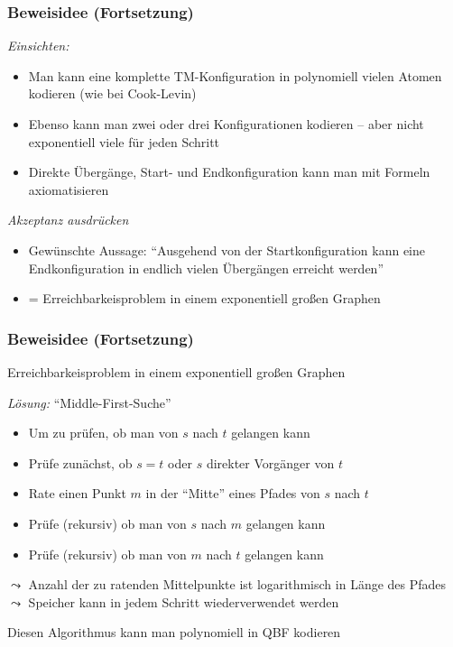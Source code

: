 \documentclass[onlymath]{beamer}
\begin{document}
\begin{frame}\frametitle{Beweisidee (Fortsetzung)}

\emph{Einsichten:}
\begin{itemize}
\item Man kann eine komplette TM-Konfiguration in polynomiell vielen Atomen
  kodieren (wie bei Cook-Levin)
\item Ebenso kann man zwei oder drei Konfigurationen kodieren -- aber nicht exponentiell viele für jeden Schritt
\item Direkte Übergänge, Start- und Endkonfiguration kann man mit Formeln axiomatisieren
\end{itemize}\bigskip\pause

\emph{Akzeptanz ausdrücken}
\begin{itemize}
\item Gewünschte Aussage: "`Ausgehend von der Startkonfiguration kann eine Endkonfiguration in endlich vielen Übergängen erreicht werden"'
\item = Erreichbarkeisproblem in einem exponentiell großen Graphen
\end{itemize}


\end{frame}

\begin{frame}\frametitle{Beweisidee (Fortsetzung)}

\alert{Erreichbarkeisproblem in einem exponentiell großen Graphen}
\bigskip\pause

\emph{Lösung:} "`Middle-First-Suche"'
\begin{itemize}
\item Um zu prüfen, ob man von $s$ nach $t$ gelangen kann
\item Prüfe zunächst, ob $s=t$ oder $s$ direkter Vorgänger von $t$
\item Rate einen Punkt $m$ in der "`Mitte"' eines Pfades von $s$ nach $t$
\item Prüfe (rekursiv) ob man von $s$ nach $m$ gelangen kann
\item Prüfe (rekursiv) ob man von $m$ nach $t$ gelangen kann
\end{itemize}\pause
$\leadsto$ Anzahl der zu ratenden Mittelpunkte ist logarithmisch in Länge des Pfades\\
$\leadsto$ Speicher kann in jedem Schritt wiederverwendet werden
\bigskip

Diesen Algorithmus kann man polynomiell in QBF kodieren

\end{frame}
\end{document}
